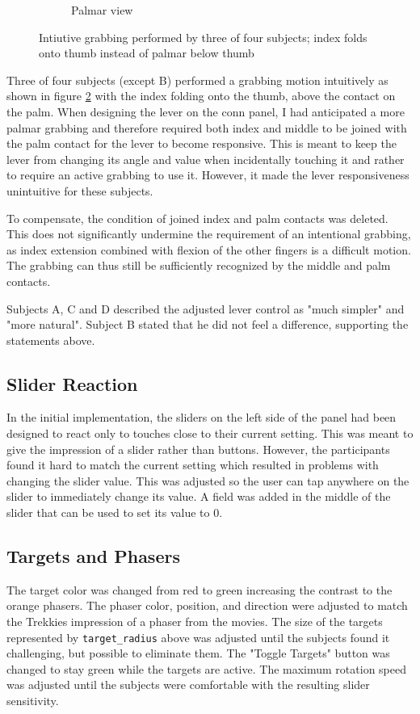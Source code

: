 \documentclass[hyperref, bachelorofscience]{cgvpub}
\begin{document}
\begin{figure}
\begin{subfigure}{.4\linewidth}
		\caption{Palmar view}
		\label{fig:grab:palmar}
	\end{subfigure}
	\caption{Intiutive grabbing performed by three of four subjects; index folds onto thumb instead of palmar below thumb}
	\label{fig:grab}
\end{figure}

Three of four subjects (except B) performed a grabbing motion intuitively as shown in figure \ref{fig:grab} with the index folding onto the thumb, above the contact on the palm. When designing the lever on the conn panel, I had anticipated a more palmar grabbing and therefore required both index and middle to be joined with the palm contact for the lever to become responsive. This is meant to keep the lever from changing its angle and value when incidentally touching it and rather to require an active grabbing to use it. However, it made the lever responsiveness unintuitive for these subjects.

To compensate, the condition of joined index and palm contacts was deleted. This does not significantly undermine the requirement of an intentional grabbing, as index extension combined with flexion of the other fingers is a difficult motion. The grabbing can thus still be sufficiently recognized by the middle and palm contacts. 

Subjects A, C and D described the adjusted lever control as "much simpler" and "more natural". Subject B stated that he did not feel a difference, supporting the statements above.

\subsection{Slider Reaction}
In the initial implementation, the sliders on the left side of the panel had been designed to react only to touches close to their current setting. This was meant to give the impression of a slider rather than buttons. However, the participants found it hard to match the current setting which resulted in problems with changing the slider value. This was adjusted so the user can tap anywhere on the slider to immediately change its value. A field was added in the middle of the slider that can be used to set its value to $ 0 $. 

\subsection{Targets and Phasers}
The target color was changed from red to green increasing the contrast to the orange phasers. The phaser color, position, and direction were adjusted to match the Trekkies impression of a phaser from the movies. The size of the targets represented by \lstinline|target_radius| above was adjusted until the subjects found it challenging, but possible to eliminate them. The "Toggle Targets" button was changed to stay green while the targets are active. The maximum rotation speed was adjusted until the subjects were comfortable with the resulting slider sensitivity.
\end{document}
